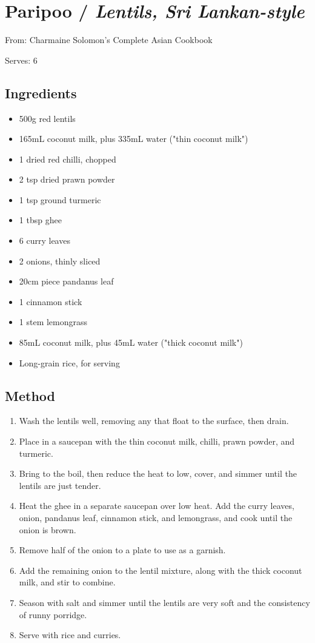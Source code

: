 \section{Paripoo / \emph{Lentils, Sri Lankan-style}}


From: Charmaine Solomon's Complete Asian Cookbook

Serves: 6

\subsection{Ingredients}

\begin{itemize}
	\item 500g red lentils
	\item 165mL coconut milk, plus 335mL water ("thin coconut milk")
	\item 1 dried red chilli, chopped
	\item 2 tsp dried prawn powder
	\item 1 tsp ground turmeric
	\item 1 tbsp ghee
	\item 6 curry leaves
	\item 2 onions, thinly sliced
	\item 20cm piece pandanus leaf
	\item 1 cinnamon stick
	\item 1 stem lemongrass
	\item 85mL coconut milk, plus 45mL water ("thick coconut milk")
	\item Long-grain rice, for serving
\end{itemize}

\subsection{Method}

\begin{enumerate}
    \item Wash the lentils well, removing any that float to the surface, then drain. 
    \item Place in a saucepan with the thin coconut milk, chilli, prawn powder, and turmeric.
    \item Bring to the boil, then reduce the heat to low, cover, and simmer until the lentils are just tender. 
    \item Heat the ghee in a separate saucepan over low heat. Add the curry leaves, onion, pandanus leaf, cinnamon stick, and lemongrass, and cook until the onion is brown.
    \item Remove half of the onion to a plate to use as a garnish.
    \item Add the remaining onion to the lentil mixture, along with the thick coconut milk, and stir to combine.
    \item Season with salt and simmer until the lentils are very soft and the consistency of runny porridge.
    \item Serve with rice and curries.
\end{enumerate}
